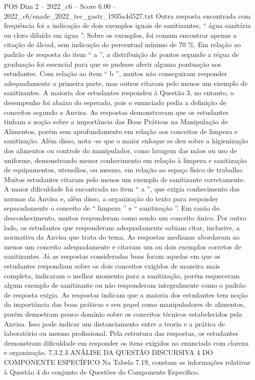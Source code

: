 \begin{textsample}{POS Dim 2 – 2022\_c6 – Score 6.00 – 2022\_c6/enade\_2022\_tec\_gastr\_1935a4d527.txt}
Outra resposta encontrada com frequência foi a indicação de dois exemplos iguais de sanitizantes, “ água sanitária ou cloro diluído em água ”.
Sobre os exemplos, foi comum encontrar apenas a citação de álcool, sem indicação do percentual mínimo de 70 \%.
Em relação ao padrão de resposta do item “ a ”, a distribuição de pontos segundo a régua de graduação foi essencial para que se pudesse aferir alguma pontuação aos estudantes.
Com relação ao item “ b ”, muitos não conseguiram responder adequadamente a primeira parte, mas outros citaram pelo menos um exemplo de sanitizantes.
A maioria dos estudantes respondeu à Questão 3, no entanto, o desempenho foi abaixo do esperado, pois o enunciado pedia a definição de conceitos segundo a Anvisa.
As respostas demonstravam que os estudantes tinham a noção sobre a importância das Boas Práticas na Manipulação de Alimentos, porém sem aprofundamento em relação aos conceitos de limpeza e sanitização.
Além disso, nota -se que o maior enfoque se deu sobre a higienização dos alimentos ou controle do manipulador, como lavagem das mãos ou uso de uniforme, demonstrando menor conhecimento em relação à limpeza e sanitização de equipamentos, utensílios, ou mesmo, em relação ao espaço físico de trabalho.
Muitos estudantes citaram pelo menos um exemplo de sanitizante corretamente.
A maior dificuldade foi encontrada no item “ a ”, que exigia conhecimento das normas da Anvisa e, além disso, a organização do texto para responder separadamente o conceito de “ limpeza ” e “ sanitização ”.
Em razão do desconhecimento, muitos responderam como sendo um conceito único.
Por outro lado, os estudantes que responderam adequadamente sabiam citar, inclusive, a normativa da Anvisa que trata do tema.
As respostas medianas abordavam ao menos um conceito adequadamente e citavam um ou dois exemplos corretos de sanitizantes.
Já as respostas consideradas boas foram aquelas em que os estudantes respondiam sobre os dois conceitos exigidos de maneira mais completa, indicaram o melhor momento para a sanitização, porém esqueceram algum exemplo de sanitizante ou não responderam integralmente como o padrão de resposta exigia.
As respostas indicam que a maioria dos estudantes tem noção da importância das boas práticas e seu papel como manipuladores de alimentos, porém demostram pouco domínio sobre os conceitos técnicos estabelecidos pela Anvisa.
Isso pode indicar um distanciamento entre a teoria e a prática de laboratório ou mesmo profissional.
Pela estrutura das respostas, os estudantes demonstram dificuldade em responder os itens exigidos no enunciado com clareza e organização. 7.3.2.3 ANÁLISE DA QUESTÃO DISCURSIVA 4 DO COMPONENTE ESPECÍFICO Na Tabela 7.19, constam as informações relativas à Questão 4 do conjunto de Questões do Componente Específico.

\end{textsample}
